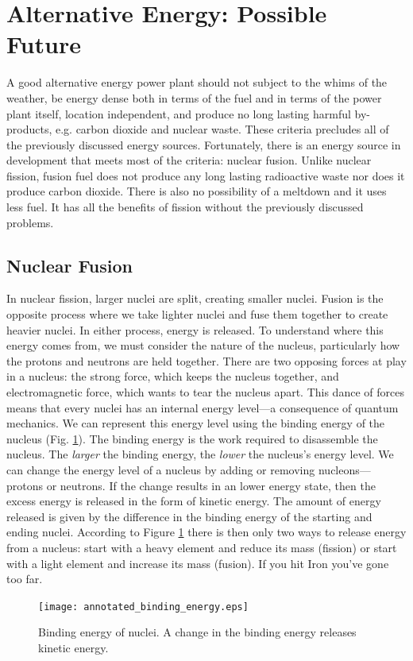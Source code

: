 \section{Alternative Energy: Possible Future}
A good alternative energy power plant should not subject to the whims of the weather, be energy dense both in terms of the fuel and in terms of the power plant itself, location independent, and produce no long lasting harmful by-products, e.g. carbon dioxide and nuclear waste. These criteria precludes all of the previously discussed energy sources. Fortunately, there is an energy source in development that meets most of the criteria: nuclear fusion. Unlike nuclear fission, fusion fuel does not produce any long lasting radioactive waste nor does it produce carbon dioxide. There is also no possibility of a meltdown and it uses less fuel. It has all the benefits of fission without the previously discussed problems.

\subsection{Nuclear Fusion}
In nuclear fission, larger nuclei are split, creating smaller nuclei. Fusion is the opposite process where we take lighter nuclei and fuse them together to create heavier nuclei. In either process, energy is released. To understand where this energy comes from, we must consider the nature of the nucleus, particularly how the protons and neutrons are held together. There are two opposing forces at play in a nucleus: the strong force, which keeps the nucleus together, and electromagnetic force, which wants to tear the nucleus apart. This dance of forces means that every nuclei has an internal energy level---a consequence of quantum mechanics.
We can represent this energy level using the binding energy of the nucleus (Fig. \ref{fig:binding_energy}). The binding energy is the work required to disassemble the nucleus. The \textit{larger} the binding energy, the \textit{lower} the nucleus's energy level. We can change the energy level of a nucleus by adding or removing nucleons---protons or neutrons. If the change results in an lower energy state, then the excess energy is released in the form of kinetic energy. The amount of energy released is given by the difference in the binding energy of the starting and ending nuclei. According to Figure \ref{fig:binding_energy} there is then only two ways to release energy from a nucleus: start with a heavy element and reduce its mass (fission) or start with a light element and increase its mass (fusion). If you hit Iron you've gone too far.
\begin{figure}[h!]
    \centering
    \texttt{[image: annotated\_binding\_energy.eps]}
    \caption{Binding energy of nuclei. A change in the binding energy releases kinetic energy.}
    \label{fig:binding_energy}
\end{figure}

